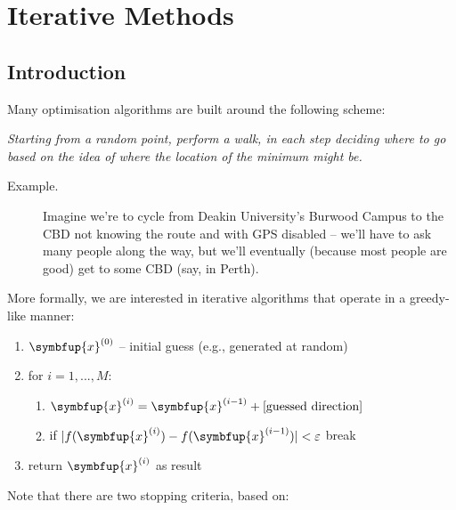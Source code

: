 \documentclass[10pt,b5paper,krantz1]{krantz}
\providecommand{\tightlist}{%
  \setlength{\itemsep}{0pt}\setlength{\parskip}{0pt}}
\renewcommand{\mathbf}[1]{\symbfup{#1}}
\renewenvironment{quote}{\begin{VF}}{\end{VF}}
\begin{document}
\hypertarget{iterative-methods}{%
\section{Iterative Methods}\label{iterative-methods}}

\hypertarget{introduction-11}{%
\subsection{Introduction}\label{introduction-11}}

Many optimisation algorithms are built around the following scheme:

\begin{quote}
\emph{Starting from a random point, perform a walk,
in each step deciding where to go based on the idea
of where the location of the minimum might be.}
\end{quote}

\begin{description}
\item[Example.]
Imagine we're to cycle from Deakin University's Burwood
Campus to the CBD not knowing the route and with GPS disabled --
we'll have to ask many people along the way, but we'll eventually
(because most people are good) get to some CBD
(say, in Perth).
\end{description}

More formally, we are interested in iterative
algorithms that operate in a greedy-like manner:

\begin{enumerate}
\def\labelenumi{\arabic{enumi}.}
\item
  \(\mathbf{x}^{(0)}\) -- initial guess (e.g., generated at random)
\item
  for \(i=1,...,M\):

  \begin{enumerate}
  \def\labelenumii{\alph{enumii}.}
  \tightlist
  \item
    \(\mathbf{x}^{(i)} = \mathbf{x}^{(i-1)}+\text{[guessed direction]}\)
  \item
    if \(|f(\mathbf{x}^{(i)})-f(\mathbf{x}^{(i-1)})| < \varepsilon\) break
  \end{enumerate}
\item
  return \(\mathbf{x}^{(i)}\) as result
\end{enumerate}

\bigskip

Note that there are two stopping criteria, based on:
\end{document}
